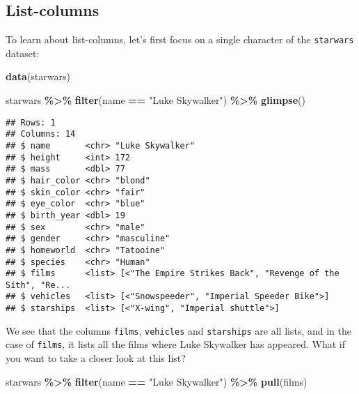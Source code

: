 \documentclass[
]{article}
\newenvironment{Shaded}{\begin{snugshade}}{\end{snugshade}}
\newcommand{\KeywordTok}[1]{\textcolor[rgb]{0.13,0.29,0.53}{\textbf{#1}}}
\newcommand{\NormalTok}[1]{#1}
\newcommand{\OperatorTok}[1]{\textcolor[rgb]{0.81,0.36,0.00}{\textbf{#1}}}
\newcommand{\StringTok}[1]{\textcolor[rgb]{0.31,0.60,0.02}{#1}}
\begin{document}
\hypertarget{list-columns}{%
\subsection{List-columns}\label{list-columns}}

To learn about list-columns, let's first focus on a single character of the \texttt{starwars} dataset:

\begin{Shaded}
\begin{Highlighting}[]
\KeywordTok{data}\NormalTok{(starwars)}
\end{Highlighting}
\end{Shaded}

\begin{Shaded}
\begin{Highlighting}[]
\NormalTok{starwars }\OperatorTok{\%\textgreater{}\%}
\StringTok{  }\KeywordTok{filter}\NormalTok{(name }\OperatorTok{==}\StringTok{ "Luke Skywalker"}\NormalTok{) }\OperatorTok{\%\textgreater{}\%}
\StringTok{  }\KeywordTok{glimpse}\NormalTok{()}
\end{Highlighting}
\end{Shaded}

\begin{verbatim}
## Rows: 1
## Columns: 14
## $ name       <chr> "Luke Skywalker"
## $ height     <int> 172
## $ mass       <dbl> 77
## $ hair_color <chr> "blond"
## $ skin_color <chr> "fair"
## $ eye_color  <chr> "blue"
## $ birth_year <dbl> 19
## $ sex        <chr> "male"
## $ gender     <chr> "masculine"
## $ homeworld  <chr> "Tatooine"
## $ species    <chr> "Human"
## $ films      <list> [<"The Empire Strikes Back", "Revenge of the Sith", "Re...
## $ vehicles   <list> [<"Snowspeeder", "Imperial Speeder Bike">]
## $ starships  <list> [<"X-wing", "Imperial shuttle">]
\end{verbatim}

We see that the columns \texttt{films}, \texttt{vehicles} and \texttt{starships} are all lists, and in the case of
\texttt{films}, it lists all the films where Luke Skywalker has appeared. What if you want to take a closer look at this list?

\begin{Shaded}
\begin{Highlighting}[]
\NormalTok{starwars }\OperatorTok{\%\textgreater{}\%}
\StringTok{  }\KeywordTok{filter}\NormalTok{(name }\OperatorTok{==}\StringTok{ "Luke Skywalker"}\NormalTok{) }\OperatorTok{\%\textgreater{}\%}
\StringTok{  }\KeywordTok{pull}\NormalTok{(films)}
\end{Highlighting}
\end{Shaded}
\end{document}
